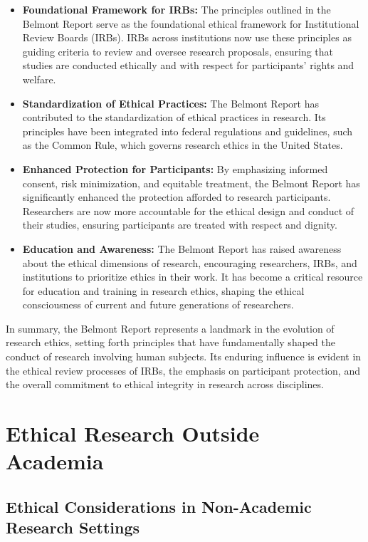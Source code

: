 \documentclass[
]{book}
\begin{document}
\begin{itemize}
\item
  \textbf{Foundational Framework for IRBs:} The principles outlined in the Belmont Report serve as the foundational ethical framework for Institutional Review Boards (IRBs). IRBs across institutions now use these principles as guiding criteria to review and oversee research proposals, ensuring that studies are conducted ethically and with respect for participants' rights and welfare.
\item
  \textbf{Standardization of Ethical Practices:} The Belmont Report has contributed to the standardization of ethical practices in research. Its principles have been integrated into federal regulations and guidelines, such as the Common Rule, which governs research ethics in the United States.
\item
  \textbf{Enhanced Protection for Participants:} By emphasizing informed consent, risk minimization, and equitable treatment, the Belmont Report has significantly enhanced the protection afforded to research participants. Researchers are now more accountable for the ethical design and conduct of their studies, ensuring participants are treated with respect and dignity.
\item
  \textbf{Education and Awareness:} The Belmont Report has raised awareness about the ethical dimensions of research, encouraging researchers, IRBs, and institutions to prioritize ethics in their work. It has become a critical resource for education and training in research ethics, shaping the ethical consciousness of current and future generations of researchers.
\end{itemize}

In summary, the Belmont Report represents a landmark in the evolution of research ethics, setting forth principles that have fundamentally shaped the conduct of research involving human subjects. Its enduring influence is evident in the ethical review processes of IRBs, the emphasis on participant protection, and the overall commitment to ethical integrity in research across disciplines.

\hypertarget{ethical-research-outside-academia}{%
\section{Ethical Research Outside Academia}\label{ethical-research-outside-academia}}

\hypertarget{ethical-considerations-in-non-academic-research-settings}{%
\subsection*{Ethical Considerations in Non-Academic Research Settings}\label{ethical-considerations-in-non-academic-research-settings}}
\end{document}
